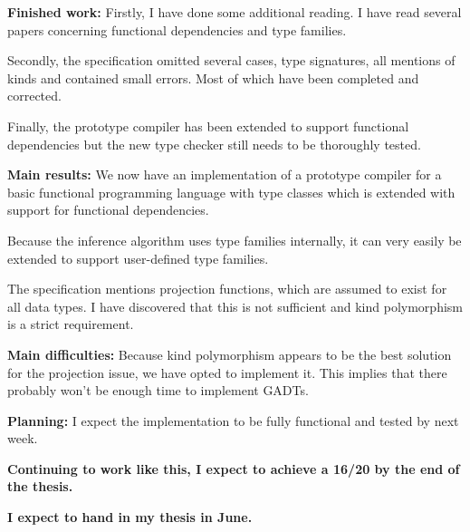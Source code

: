 \documentclass[12pt]{report}
\begin{document}
\vspace{.5cm}
{\bf Finished work:}
Firstly, I have done some additional reading. I have read several papers
concerning functional dependencies and type families.

Secondly, the specification omitted several cases, type signatures, all mentions
of kinds and contained small errors. Most of which have been completed and
corrected.

Finally, the prototype compiler has been extended to support functional
dependencies but the new type checker still needs to be thoroughly tested.

\vspace{.5cm}
{\bf Main results:}
We now have an implementation of a prototype compiler for a basic functional
programming language with type classes which is extended with support for
functional dependencies.

Because the inference algorithm uses type families internally, it can very
easily be extended to support user-defined type families.

The specification mentions projection functions, which are assumed to exist for
all data types. I have discovered that this is not sufficient and kind
polymorphism is a strict requirement.

\vspace{.5cm}
{\bf Main difficulties:}
Because kind polymorphism appears to be the best solution for the projection
issue, we have opted to implement it. This implies that there probably won't be
enough time to implement GADTs.

\vspace{.5cm}
{\bf Planning:}
I expect the implementation to be fully functional and tested by next week.

\vspace{1cm}
{\bf Continuing to work like this, I expect to achieve a 16/20 by the end of the
thesis.}

{\bf I expect to hand in my thesis in June.}
\end{document}
